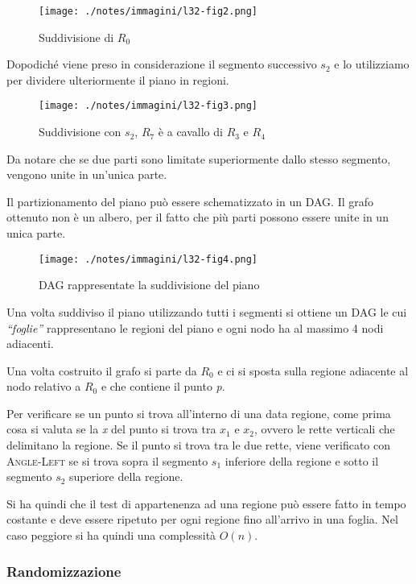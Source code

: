 \begin{figure}[htbp]
\centering
\texttt{[image: ./notes/immagini/l32-fig2.png]}
\caption{Suddivisione di $R_0$}
\end{figure}
\FloatBarrier

Dopodiché viene preso in considerazione il segmento successivo $s_2$ e lo utilizziamo per dividere ulteriormente il piano in regioni.

\begin{figure}[htbp]
\centering
\texttt{[image: ./notes/immagini/l32-fig3.png]}
\caption{Suddivisione con $s_2$, $R_7$ è a cavallo di $R_3$ e $R_4$}
\end{figure}

Da notare che se due parti sono limitate superiormente dallo stesso segmento, vengono unite in un'unica parte.

Il partizionamento del piano può essere schematizzato in un DAG. 
Il grafo ottenuto non è un albero, per il fatto che più parti possono essere unite in un unica parte.

\begin{figure}[htbp]
\centering
\texttt{[image: ./notes/immagini/l32-fig4.png]}
\caption{DAG rappresentate la suddivisione del piano}
\end{figure}

Una volta suddiviso il piano utilizzando tutti i segmenti si ottiene un DAG le cui \emph{``foglie''} rappresentano le regioni del piano e ogni nodo ha al massimo 4 nodi adiacenti.

Una volta costruito il grafo si parte da $R_0$ e ci si sposta sulla regione adiacente al nodo relativo a $R_0$ e che contiene il punto \emph{p}.

Per verificare se un punto si trova all'interno di una data regione, come prima cosa si valuta se la \emph{x} del punto si trova tra $x_1$ e $x_2$, ovvero le rette verticali che delimitano la regione. 
Se il punto si trova tra le due rette, viene verificato con \textsc{Angle-Left} se si trova sopra il segmento $s_1$ inferiore della regione e sotto il segmento $s_2$ superiore della regione.

Si ha quindi che il test di appartenenza ad una regione può essere fatto in tempo costante e deve essere ripetuto per ogni regione fino all'arrivo in una foglia. 
Nel caso peggiore si ha quindi una complessità $O(n)$.
\FloatBarrier
\subsubsection{Randomizzazione}\label{randomizzazione}

